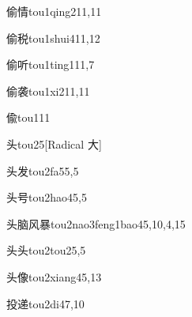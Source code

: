 \begin{verbete}{偷情}{tou1qing2}{11,11}
\end{verbete}

\begin{verbete}{偷税}{tou1shui4}{11,12}
\end{verbete}

\begin{verbete}{偷听}{tou1ting1}{11,7}
\end{verbete}

\begin{verbete}{偷袭}{tou1xi2}{11,11}
\end{verbete}

\begin{verbete}{偸}{tou1}{11}
\end{verbete}

\begin{verbete}{头}{tou2}{5}[Radical 大]
\end{verbete}

\begin{verbete}{头发}{tou2fa5}{5,5}
\end{verbete}

\begin{verbete}{头号}{tou2hao4}{5,5}
\end{verbete}

\begin{verbete}{头脑风暴}{tou2nao3feng1bao4}{5,10,4,15}
\end{verbete}

\begin{verbete}{头头}{tou2tou2}{5,5}
\end{verbete}

\begin{verbete}{头像}{tou2xiang4}{5,13}
\end{verbete}

\begin{verbete}{投递}{tou2di4}{7,10}
\end{verbete}

